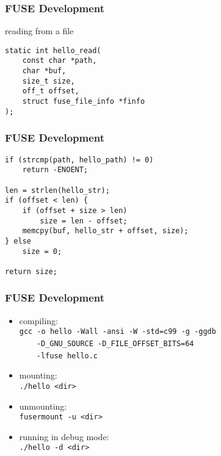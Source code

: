 \documentclass[dvipsnames]{beamer}
\begin{document}
\begin{frame}[fragile]
  \frametitle{FUSE Development}

  \begin{block}{reading from a file}
    \begin{lstlisting}
static int hello_read(
    const char *path,
    char *buf,
    size_t size,
    off_t offset,
    struct fuse_file_info *finfo
);
    \end{lstlisting}
  \end{block}
\end{frame}

\begin{frame}[fragile]
  \frametitle{FUSE Development}

  \begin{example}
    \begin{lstlisting}
if (strcmp(path, hello_path) != 0)
    return -ENOENT;

len = strlen(hello_str);
if (offset < len) {
    if (offset + size > len)
        size = len - offset;
    memcpy(buf, hello_str + offset, size);
} else
    size = 0;

return size;
    \end{lstlisting}
  \end{example}
\end{frame}

\begin{frame}
  \frametitle{FUSE Development}

  \begin{itemize}
    \item compiling:\\
      \lstinline!gcc -o hello -Wall -ansi -W -std=c99 -g -ggdb!\\
      ~~~~\lstinline!-D_GNU_SOURCE -D_FILE_OFFSET_BITS=64!\\
      ~~~~\lstinline!-lfuse hello.c!

    \item mounting:\\
      \lstinline!./hello <dir>!

    \item unmounting:\\
      \lstinline!fusermount -u <dir>!

    \item running in debug mode:\\
      \lstinline!./hello -d <dir>!
  \end{itemize}
\end{frame}
\end{document}
